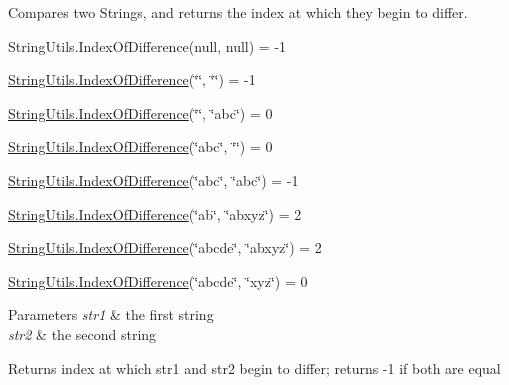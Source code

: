 Compares two Strings, and returns the index at which they begin to differ. 

String\+Utils.\+Index\+Of\+Difference(null, null) = -\/1 

\hyperlink{class_ultimate_1_1_utilities_1_1_string_utils_a991ddd501f079758a091137cfa8dd59d}{String\+Utils.\+Index\+Of\+Difference}(\char`\"{}\char`\"{}, \char`\"{}\char`\"{}) = -\/1 

\hyperlink{class_ultimate_1_1_utilities_1_1_string_utils_a991ddd501f079758a091137cfa8dd59d}{String\+Utils.\+Index\+Of\+Difference}(\char`\"{}\char`\"{}, \char`\"{}abc\char`\"{}) = 0 

\hyperlink{class_ultimate_1_1_utilities_1_1_string_utils_a991ddd501f079758a091137cfa8dd59d}{String\+Utils.\+Index\+Of\+Difference}(\char`\"{}abc\char`\"{}, \char`\"{}\char`\"{}) = 0 

\hyperlink{class_ultimate_1_1_utilities_1_1_string_utils_a991ddd501f079758a091137cfa8dd59d}{String\+Utils.\+Index\+Of\+Difference}(\char`\"{}abc\char`\"{}, \char`\"{}abc\char`\"{}) = -\/1 

\hyperlink{class_ultimate_1_1_utilities_1_1_string_utils_a991ddd501f079758a091137cfa8dd59d}{String\+Utils.\+Index\+Of\+Difference}(\char`\"{}ab\char`\"{}, \char`\"{}abxyz\char`\"{}) = 2 

\hyperlink{class_ultimate_1_1_utilities_1_1_string_utils_a991ddd501f079758a091137cfa8dd59d}{String\+Utils.\+Index\+Of\+Difference}(\char`\"{}abcde\char`\"{}, \char`\"{}abxyz\char`\"{}) = 2 

\hyperlink{class_ultimate_1_1_utilities_1_1_string_utils_a991ddd501f079758a091137cfa8dd59d}{String\+Utils.\+Index\+Of\+Difference}(\char`\"{}abcde\char`\"{}, \char`\"{}xyz\char`\"{}) = 0 


\begin{DoxyParams}{Parameters}
{\em str1} & the first string\\
\hline
{\em str2} & the second string\\
\hline
\end{DoxyParams}
\begin{DoxyReturn}{Returns}
index at which str1 and str2 begin to differ; returns -\/1 if both are equal
\end{DoxyReturn}
